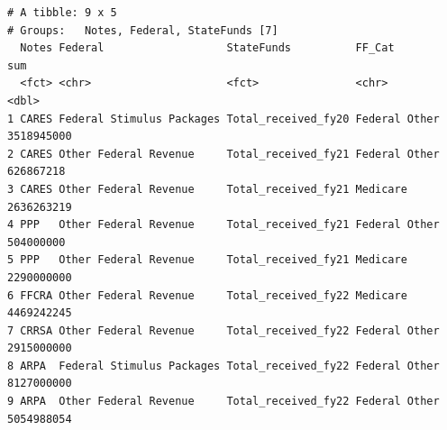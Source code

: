 \documentclass[
  letterpaper,
  DIV=11,
  numbers=noendperiod]{scrreport}
\begin{document}
\begin{verbatim}
# A tibble: 9 x 5
# Groups:   Notes, Federal, StateFunds [7]
  Notes Federal                   StateFunds          FF_Cat               sum
  <fct> <chr>                     <fct>               <chr>              <dbl>
1 CARES Federal Stimulus Packages Total_received_fy20 Federal Other 3518945000
2 CARES Other Federal Revenue     Total_received_fy21 Federal Other  626867218
3 CARES Other Federal Revenue     Total_received_fy21 Medicare      2636263219
4 PPP   Other Federal Revenue     Total_received_fy21 Federal Other  504000000
5 PPP   Other Federal Revenue     Total_received_fy21 Medicare      2290000000
6 FFCRA Other Federal Revenue     Total_received_fy22 Medicare      4469242245
7 CRRSA Other Federal Revenue     Total_received_fy22 Federal Other 2915000000
8 ARPA  Federal Stimulus Packages Total_received_fy22 Federal Other 8127000000
9 ARPA  Other Federal Revenue     Total_received_fy22 Federal Other 5054988054
\end{verbatim}
\end{document}
